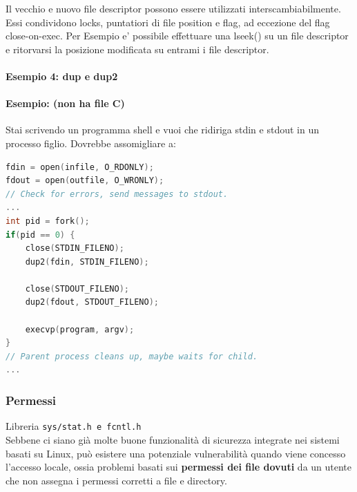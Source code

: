 Il vecchio e nuovo file descriptor possono essere utilizzati interscambiabilmente. Essi condividono locks, puntatiori di file position e flag, ad eccezione del flag close-on-exec.
Per Esempio e' possibile effettuare una lseek() su un file descriptor e ritorvarsi la posizione modificata su entrami i file descriptor. 



\paragraph{Esempio 4: dup e dup2}\hfill \break


\paragraph{Esempio: (non ha file C)}
Stai scrivendo un programma shell e vuoi che ridiriga stdin e stdout in un processo figlio. Dovrebbe assomigliare a:
\begin{lstlisting}[language=C]
fdin = open(infile, O_RDONLY);
fdout = open(outfile, O_WRONLY);
// Check for errors, send messages to stdout.
...
int pid = fork();
if(pid == 0) {
    close(STDIN_FILENO);
    dup2(fdin, STDIN_FILENO);

    close(STDOUT_FILENO);
    dup2(fdout, STDOUT_FILENO);
    
    execvp(program, argv);
}
// Parent process cleans up, maybe waits for child.
...
\end{lstlisting}

\subsubsection{Permessi}
Libreria \texttt{sys/stat.h e fcntl.h}\\
Sebbene ci siano già molte buone funzionalità di sicurezza integrate nei sistemi basati su Linux, può esistere una potenziale vulnerabilità quando viene concesso l'accesso locale, ossia problemi basati sui \textbf{permessi dei file dovuti} da un utente che non assegna i permessi corretti a file e directory.
